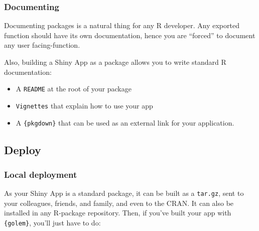 \documentclass[]{book}
\newenvironment{Shaded}{\begin{snugshade}}{\end{snugshade}}
\newcommand{\DecValTok}[1]{\textcolor[rgb]{0.00,0.00,0.81}{#1}}
\newcommand{\KeywordTok}[1]{\textcolor[rgb]{0.13,0.29,0.53}{\textbf{#1}}}
\newcommand{\NormalTok}[1]{#1}
\newcommand{\OperatorTok}[1]{\textcolor[rgb]{0.81,0.36,0.00}{\textbf{#1}}}
\newcommand{\StringTok}[1]{\textcolor[rgb]{0.31,0.60,0.02}{#1}}
\providecommand{\tightlist}{%
  \setlength{\itemsep}{0pt}\setlength{\parskip}{0pt}}
\begin{document}
\begin{Shaded}
\end{Shaded}

\hypertarget{documenting}{%
\subsubsection{Documenting}\label{documenting}}

Documenting packages is a natural thing for any R developer. Any exported function should have its own documentation, hence you are ``forced'' to document any user facing-function.

Also, building a Shiny App as a package allows you to write standard R documentation:

\begin{itemize}
\tightlist
\item
  A \texttt{README} at the root of your package
\item
  \texttt{Vignettes} that explain how to use your app
\item
  A \texttt{\{pkgdown\}} that can be used as an external link for your application.
\end{itemize}

\hypertarget{deploy}{%
\subsection{Deploy}\label{deploy}}

\hypertarget{local-deployment}{%
\subsubsection{Local deployment}\label{local-deployment}}

As your Shiny App is a standard package, it can be built as a \texttt{tar.gz}, sent to your colleagues, friends, and family, and even to the CRAN. It can also be installed in any R-package repository. Then, if you've built your app with \texttt{\{golem\}}, you'll just have to do:
\end{document}
